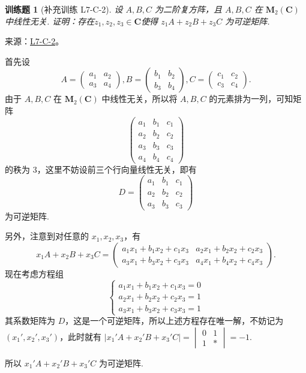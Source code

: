\documentclass[12pt,fontset=fandol]{ctexart}
\newtheorem{exercise}{训练题}[section]
\begin{document}
\begin{exercise}[补充训练 L7-C-2]\label{prob:L7-C-2}
设 $A,B,C$ 为二阶复方阵，且 $A,B,C$ 在 $\mathbf{M}_2(\mathbf{C})$ 中线性无关. 证明：存在$z_1,z_2,z_3 \in \mathbf{C}$使得 $z_1A+z_2B+z_3C$ 为可逆矩阵.
\end{exercise}
\noindent 来源：\href{https://github.com/yhwu-is/Linear-Algebra-Left-Undone/blob/new/%E8%AE%B2%E4%B9%89/%E4%B8%93%E9%A2%98/7%20%E7%BA%BF%E6%80%A7%E6%98%A0%E5%B0%84%E7%9F%A9%E9%98%B5%E8%A1%A8%E7%A4%BA%E4%B8%8E%E7%9F%A9%E9%98%B5%E8%BF%90%E7%AE%97%E5%9F%BA%E7%A1%80.tex}{L7-C-2}。
\begin{solve}
首先设
            \[A=\begin{pmatrix}a_1 & a_2 \\ a_3 & a_4\end{pmatrix},B=\begin{pmatrix}b_1 & b_2 \\ b_3 & b_4\end{pmatrix},C=\begin{pmatrix}c_1 & c_2 \\ c_3 & c_4\end{pmatrix}.\]
            由于 $A,B,C$ 在 $\mathbf{M}_2(\mathbf{C})$ 中线性无关，所以将 $A,B,C$ 的元素排为一列，可知矩阵
            \[\begin{pmatrix}a_1 & b_1 & c_1 \\ a_2 & b_2 & c_2 \\ a_3 & b_3 & c_3 \\ a_4 & b_4 & c_4\end{pmatrix}\]
            的秩为 3，这里不妨设前三个行向量线性无关，即有
            \[D=\begin{pmatrix}a_1 & b_1 & c_1 \\ a_2 & b_2 & c_2 \\ a_3 & b_3 & c_3\end{pmatrix}\]
            为可逆矩阵.

            另外，注意到对任意的 $x_1,x_2,x_3$，有
            \[x_1A+x_2B+x_3C=\begin{pmatrix}a_1x_1+b_1x_2+c_1x_3 & a_2x_1+b_2x_2+c_2x_3 \\ a_3x_1+b_3x_2+c_3x_3 & a_4x_1+b_4x_2+c_4x_3\end{pmatrix}.\]
            现在考虑方程组
            \[\begin{cases}a_1x_1+b_1x_2+c_1x_3 = 0 \\ a_2x_1+b_2x_2+c_2x_3 = 1 \\ a_3x_1+b_3x_2+c_3x_3 = 1\end{cases}\]
            其系数矩阵为 $D$，这是一个可逆矩阵，所以上述方程存在唯一解，不妨记为 $(x_1',x_2',x_3')$，此时就有 $\lvert x_1'A+x_2'B+x_3'C \rvert = \begin{vmatrix}0 & 1 \\ 1 & \ast\end{vmatrix} = -1$.

            所以 $x_1'A+x_2'B+x_3'C$ 为可逆矩阵.
\end{solve}
\end{document}
